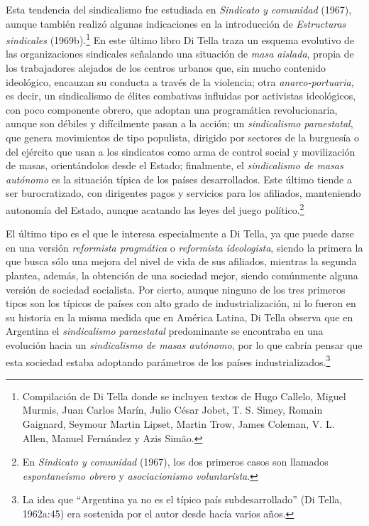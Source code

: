 Esta tendencia del sindicalismo fue estudiada en \emph{Sindicato y comunidad} (1967), aunque también realizó algunas indicaciones en la introducción de \emph{Estructuras sindicales} (1969b).\footnote{Compilación de Di Tella donde se incluyen textos de Hugo Callelo, Miguel Murmis, Juan Carlos Marín, Julio César Jobet, T. S. Simey, Romain Gaignard, Seymour Martin Lipset, Martin Trow, James Coleman, V. L. Allen, Manuel Fernández y Azis Simão.} En este último libro Di Tella traza un esquema evolutivo de las organizaciones sindicales señalando una situación de \emph{masa aislada}, propia de los trabajadores alejados de los centros urbanos que, sin mucho contenido ideológico, encauzan su conducta a través de la violencia; otra \emph{anarco-portuaria}, es decir, un sindicalismo de élites combativas influidas por activistas ideológicos, con poco componente obrero, que adoptan una programática revolucionaria, aunque son débiles y difícilmente pasan a la acción; un \emph{sindicalismo paraestatal}, que genera movimientos de tipo populista, dirigido por sectores de la burguesía o del ejército que usan a los sindicatos como arma de control social y movilización de masas, orientándolos desde el Estado; finalmente, el \emph{sindicalismo de masas autónomo} es la situación típica de los países desarrollados. Este último tiende a ser burocratizado, con dirigentes pagos y servicios para los afiliados, manteniendo autonomía del Estado, aunque acatando las leyes del juego político.\footnote{En \emph{Sindicato y comunidad} (1967), los dos primeros casos son llamados \emph{espontaneísmo obrero} y \emph{asociacionismo voluntarista}.}

El último tipo es el que le interesa especialmente a Di Tella, ya que puede darse en una versión \emph{reformista pragmática} o \emph{reformista ideologista}, siendo la primera la que busca sólo una mejora del nivel de vida de sus afiliados, mientras la segunda plantea, además, la obtención de una sociedad mejor, siendo comúnmente alguna versión de sociedad socialista. Por cierto, aunque ninguno de los tres primeros tipos son los típicos de países con alto grado de industrialización, ni lo fueron en su historia en la misma medida que en América Latina, Di Tella observa que en Argentina el \emph{sindicalismo paraestatal} predominante se encontraba en una evolución hacia un \emph{sindicalismo de masas autónomo}, por lo que cabría pensar que esta sociedad estaba adoptando parámetros de los países industrializados.\footnote{La idea que ``Argentina ya no es el típico país subdesarrollado'' (Di Tella, 1962a:45) era sostenida por el autor desde hacía varios años.}


